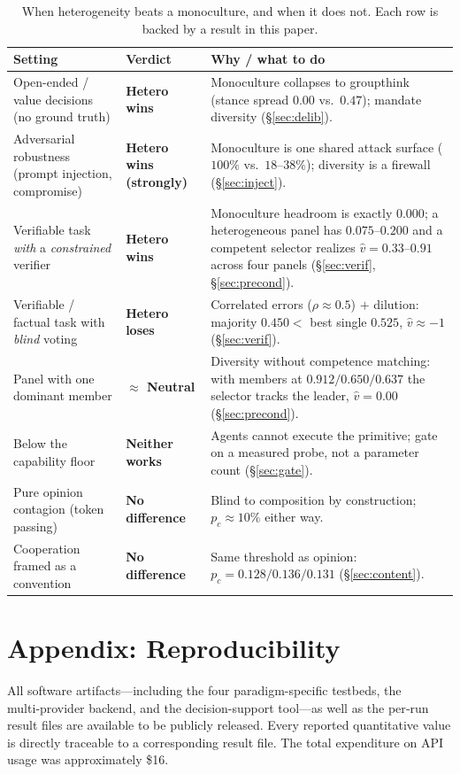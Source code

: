 \documentclass[manuscript,screen,review]{acmart}
\begin{document}
\begin{table}[t]
\caption{When heterogeneity beats a monoculture, and when it does not. Each row is backed by
a result in this paper.}
\label{tab:verdict}
\small
\begin{tabular}{@{}p{2.9cm}p{1.5cm}p{4.7cm}@{}}
\toprule
\textbf{Setting} & \textbf{Verdict} & \textbf{Why / what to do} \\
\midrule
Open-ended / value decisions (no ground truth) & \textbf{Hetero wins} & Monoculture collapses to groupthink (stance spread $0.00$ vs.\ $0.47$); mandate diversity (\S\ref{sec:delib}). \\
Adversarial robustness (prompt injection, compromise) & \textbf{Hetero wins (strongly)} & Monoculture is one shared attack surface ($100\%$ vs.\ $18$--$38\%$); diversity is a firewall (\S\ref{sec:inject}). \\
Verifiable task \emph{with} a \emph{constrained} verifier & \textbf{Hetero wins} & Monoculture headroom is exactly $0.000$; a heterogeneous panel has $0.075$--$0.200$ and a competent selector realizes $\hat v{=}0.33$--$0.91$ across four panels (\S\ref{sec:verif}, \S\ref{sec:precond}). \\
Verifiable / factual task with \emph{blind} voting & \textbf{Hetero loses} & Correlated errors ($\rho{\approx}0.5$) $+$ dilution: majority $0.450 <$ best single $0.525$, $\hat v{\approx}{-}1$ (\S\ref{sec:verif}). \\
Panel with one dominant member & \textbf{$\approx$ Neutral} & Diversity without competence matching: with members at $0.912/0.650/0.637$ the selector tracks the leader, $\hat v{=}0.00$ (\S\ref{sec:precond}). \\
Below the capability floor & \textbf{Neither works} & Agents cannot execute the primitive; gate on a measured probe, not a parameter count (\S\ref{sec:gate}). \\
Pure opinion contagion (token passing) & \textbf{No difference} & Blind to composition by construction; $p_c{\approx}10\%$ either way. \\
Cooperation framed as a convention & \textbf{No difference} & Same threshold as opinion: $p_c{=}0.128/0.136/0.131$ (\S\ref{sec:content}). \\
\bottomrule
\end{tabular}
\end{table}

\section*{Appendix: Reproducibility}
All software artifacts—including the four paradigm-specific testbeds, the multi‑provider backend, and the decision-support tool—as well as the per‑run result files are available to be publicly released. Every reported quantitative value is directly traceable to a corresponding result file. The total expenditure on API usage was approximately \$16.
\end{document}
